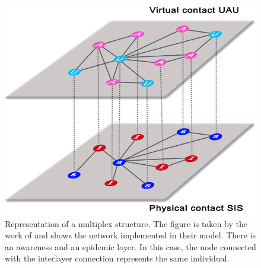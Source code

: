 \begin{figure}[]
	\centering
	\includegraphics[width=0.6\linewidth]{0_introduction/images_introduction/multi_layer}
	\caption[Multi-layer network]{Representation of a multiplex structure. The figure is taken by the work of \cite{Granell2013} and shows the network implemented in their model. There is an awareness and an epidemic layer. In this case, the node connected with the interlayer connection represents the same individual.}
	\label{fig:multilayer}
\end{figure}


